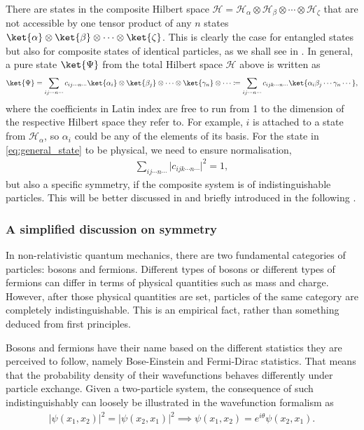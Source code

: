 There are states in the composite Hilbert space $\mathcal{H} = \mathcal{H}_\alpha \otimes \mathcal{H}_\beta \otimes \cdots \otimes \mathcal{H}_\zeta$ that are not accessible by one tensor product of any $n$ states $\ket{\alpha} \otimes \ket{\beta} \otimes \cdots \otimes\ket{\zeta}$. This is clearly the case for entangled states but also for composite states of identical particles, as we shall see in . In general, a pure state $\ket{\Psi}$ from the total Hilbert space $\mathcal{H}$ above is written as
\begin{align}
    \ket{\Psi} = \sum_{ij\cdots n\cdots}c_{ij\cdots n\cdots } \ket{\alpha_i}\otimes\ket{\beta_j}\otimes \cdots \otimes \ket{\gamma_n}\otimes \cdots \coloneqq  \sum_{ij\cdots n\cdots}c_{ijk\cdots n \cdots}\ket{\alpha_i\beta_j \cdots \gamma_n  \cdots},
    \label{eq:general_state}
\end{align}
where the coefficients in Latin index are free to run from 1 to the dimension of the respective Hilbert space they refer to. For example, $i$ is attached to a state from $\mathcal{H}_\alpha$, so $\alpha_i$ could be any of the elements of its basis. For the state in \eqref{eq:general_state} to be physical, we need to ensure normalisation,
\begin{align*}
    \sum_{ij\cdots n\cdots} \vert c_{ijk\cdots n\cdots}\vert^2 = 1,
\end{align*}
but also a specific symmetry, if the composite system is of indistinguishable particles. This will be better discussed in  and briefly introduced in the following .

\subsubsection{A simplified discussion on symmetry}\label{sec:symmetry}

In non-relativistic quantum mechanics, there are two fundamental categories of particles: bosons and fermions. Different types of bosons or different types of fermions can differ in terms of physical quantities such as mass and charge. However, after those physical quantities are set, particles of the same category are completely indistinguishable. This is an empirical fact, rather than something deduced from first principles. 

Bosons and fermions have their name based on the different statistics they are perceived to follow, namely Bose-Einstein and Fermi-Dirac statistics. That means that the probability density of their wavefunctions behaves differently under particle exchange. Given a two-particle system, the consequence of such indistinguishably can loosely be illustrated in the wavefunction formalism as
\begin{align*}
    |\psi(x_1, x_2)|^2 = |\psi(x_2, x_1)|^2 \implies \psi(x_1, x_2) = e^{i\theta}\psi(x_2, x_1).
\end{align*}

